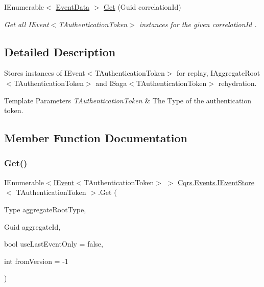 \begin{DoxyCompactItemize}
I\+Enumerable$<$ \hyperlink{classCqrs_1_1Events_1_1EventData}{Event\+Data} $>$ \hyperlink{interfaceCqrs_1_1Events_1_1IEventStore_af398bb6768fa661ad97a9fa9ecfbd9fb_af398bb6768fa661ad97a9fa9ecfbd9fb}{Get} (Guid correlation\+Id)
\begin{DoxyCompactList}\small\item\em Get all I\+Event$<$\+T\+Authentication\+Token$>$ instances for the given {\itshape correlation\+Id} . \end{DoxyCompactList}\end{DoxyCompactItemize}


\subsection{Detailed Description}
Stores instances of I\+Event$<$\+T\+Authentication\+Token$>$ for replay, I\+Aggregate\+Root$<$\+T\+Authentication\+Token$>$ and I\+Saga$<$\+T\+Authentication\+Token$>$ rehydration. 


\begin{DoxyTemplParams}{Template Parameters}
{\em T\+Authentication\+Token} & The Type of the authentication token.\\
\hline
\end{DoxyTemplParams}


\subsection{Member Function Documentation}
\mbox{\label{interfaceCqrs_1_1Events_1_1IEventStore_ae02ef6c804d0c4a92705a447bc4b2214_ae02ef6c804d0c4a92705a447bc4b2214}} 
\subsubsection{\texorpdfstring{Get()}{Get()}\hspace{0.1cm}{\footnotesize\ttfamily [1/2]}}
{\footnotesize\ttfamily I\+Enumerable$<$\hyperlink{interfaceCqrs_1_1Events_1_1IEvent}{I\+Event}$<$T\+Authentication\+Token$>$ $>$ \hyperlink{interfaceCqrs_1_1Events_1_1IEventStore}{Cqrs.\+Events.\+I\+Event\+Store}$<$ T\+Authentication\+Token $>$.Get (\begin{DoxyParamCaption}\item[{Type}]{aggregate\+Root\+Type,  }\item[{Guid}]{aggregate\+Id,  }\item[{bool}]{use\+Last\+Event\+Only = {\ttfamily false},  }\item[{int}]{from\+Version = {\ttfamily -\/1} }\end{DoxyParamCaption})}



